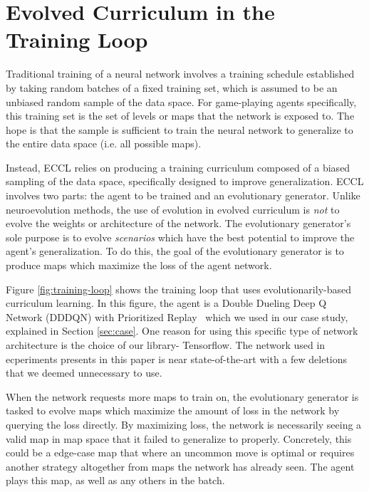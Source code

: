 \documentclass[letterpaper]{article} %
\begin{document}
\section{Evolved Curriculum in the Training Loop}\label{sec:theory}

Traditional training of a neural network involves a training schedule established by taking random batches of a fixed training set, which is assumed to be an unbiased random sample of the data space. For game-playing agents specifically, this training set is the set of levels or maps that the network is exposed to. The hope is that the sample is sufficient to train the neural network to generalize to the entire data space (i.e. all possible maps).

Instead, ECCL relies on producing a training curriculum composed of a biased sampling of the data space, specifically designed to improve generalization. ECCL involves two parts: the agent to be trained and an evolutionary generator. Unlike neuroevolution methods, the use of evolution in evolved curriculum is \emph{not} to evolve the weights or architecture of the network. The evolutionary generator's sole purpose is to evolve \emph{scenarios} which have the best potential to improve the agent's generalization. To do this, the goal of the evolutionary generator is to produce maps which maximize the loss of the agent network.

Figure \ref{fig:training-loop} shows the training loop that uses evolutionarily-based curriculum learning. In this figure, the agent is a Double Dueling Deep Q Network (DDDQN) with Prioritized Replay~\cite{wang2016dueling,schaul2015prioritized} which we used in our case study, explained in Section \ref{sec:case}. One reason for using this specific type of network architecture is the choice of our library- Tensorflow. The network used in ecperiments presents in this paper is near state-of-the-art with a few deletions that we deemed unnecessary to use.

When the network requests more maps to train on, the evolutionary generator is tasked to evolve maps which maximize the amount of loss in the network by querying the loss directly. By maximizing loss, the network is necessarily seeing a valid map in map space that it failed to generalize to properly. Concretely, this could be a edge-case map that where an uncommon move is optimal or requires another strategy altogether from maps the network has already seen. The agent plays this map, as well as any others in the batch.
\end{document}
